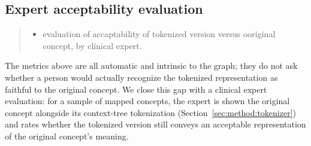 \subsection{Expert acceptability evaluation}
\label{sec:method:expert-eval}

\begin{quote}\small\itshape
\begin{itemize}
\item evaluation of accaptability of tokenized version versus ooriginal concept, by clinical expert.
\end{itemize}
\end{quote}

The metrics above are all automatic and intrinsic to the graph; they do not
ask whether a person would actually recognize the tokenized representation
as faithful to the original concept. We close this gap with a clinical
expert evaluation: for a sample of mapped concepts, the expert is shown the
original concept alongside its context-tree tokenization
(Section~\ref{sec:method:tokenizer}) and rates whether the tokenized version
still conveys an acceptable representation of the original concept's
meaning.  
